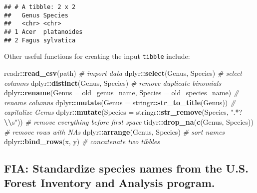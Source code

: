 \documentclass[
  11pt,
]{article}
\newenvironment{Shaded}{\begin{snugshade}}{\end{snugshade}}
\newcommand{\AttributeTok}[1]{\textcolor[rgb]{0.13,0.29,0.53}{#1}}
\newcommand{\CommentTok}[1]{\textcolor[rgb]{0.56,0.35,0.01}{\textit{#1}}}
\newcommand{\FunctionTok}[1]{\textcolor[rgb]{0.13,0.29,0.53}{\textbf{#1}}}
\newcommand{\NormalTok}[1]{#1}
\newcommand{\OtherTok}[1]{\textcolor[rgb]{0.56,0.35,0.01}{#1}}
\newcommand{\SpecialCharTok}[1]{\textcolor[rgb]{0.81,0.36,0.00}{\textbf{#1}}}
\newcommand{\StringTok}[1]{\textcolor[rgb]{0.31,0.60,0.02}{#1}}
\begin{document}
\begin{verbatim}
## # A tibble: 2 x 2
##   Genus Species    
##   <chr> <chr>      
## 1 Acer  platanoides
## 2 Fagus sylvatica
\end{verbatim}

Other useful functions for creating the input \verb|tibble| include:

\begin{Shaded}
\begin{Highlighting}[]
\NormalTok{readr}\SpecialCharTok{::}\FunctionTok{read\_csv}\NormalTok{(}\StringTok{\textquotesingle{}path\textquotesingle{}}\NormalTok{) }\CommentTok{\# import data}
\NormalTok{dplyr}\SpecialCharTok{::}\FunctionTok{select}\NormalTok{(Genus, Species) }\CommentTok{\# select columns}
\NormalTok{dplyr}\SpecialCharTok{::}\FunctionTok{distinct}\NormalTok{(Genus, Species) }\CommentTok{\# remove duplicate binomials}
\NormalTok{dplyr}\SpecialCharTok{::}\FunctionTok{rename}\NormalTok{(}\StringTok{\textquotesingle{}Genus\textquotesingle{}} \OtherTok{=} \StringTok{\textquotesingle{}old\_genus\_name\textquotesingle{}}\NormalTok{,}
                \StringTok{\textquotesingle{}Species\textquotesingle{}} \OtherTok{=} \StringTok{\textquotesingle{}old\_species\_name\textquotesingle{}}\NormalTok{) }\CommentTok{\# rename columns}
\NormalTok{dplyr}\SpecialCharTok{::}\FunctionTok{mutate}\NormalTok{(}\AttributeTok{Genus =}\NormalTok{ stringr}\SpecialCharTok{::}\FunctionTok{str\_to\_title}\NormalTok{(Genus)) }\CommentTok{\# capitalize Genus}
\NormalTok{dplyr}\SpecialCharTok{::}\FunctionTok{mutate}\NormalTok{(}\AttributeTok{Species =}\NormalTok{ stringr}\SpecialCharTok{::}\FunctionTok{str\_remove}\NormalTok{(Species, }\StringTok{".*?}\SpecialCharTok{\textbackslash{}\textbackslash{}}\StringTok{s"}\NormalTok{)) }\CommentTok{\# remove everything before first space}
\NormalTok{tidyr}\SpecialCharTok{::}\FunctionTok{drop\_na}\NormalTok{(}\FunctionTok{c}\NormalTok{(}\StringTok{\textquotesingle{}Genus\textquotesingle{}}\NormalTok{, }\StringTok{\textquotesingle{}Species\textquotesingle{}}\NormalTok{)) }\CommentTok{\# remove rows with NA\textquotesingle{}s}
\NormalTok{dplyr}\SpecialCharTok{::}\FunctionTok{arrange}\NormalTok{(Genus, Species) }\CommentTok{\# sort names}
\NormalTok{dplyr}\SpecialCharTok{::}\FunctionTok{bind\_rows}\NormalTok{(x, y) }\CommentTok{\# concatenate two tibble\textquotesingle{}s}
\end{Highlighting}
\end{Shaded}

\hypertarget{fia-standardize-species-names-from-the-u.s.-forest-inventory-and-analysis-program.}{%
\subsection{FIA: Standardize species names from the U.S. Forest
Inventory and Analysis
program.}\label{fia-standardize-species-names-from-the-u.s.-forest-inventory-and-analysis-program.}}
\end{document}
